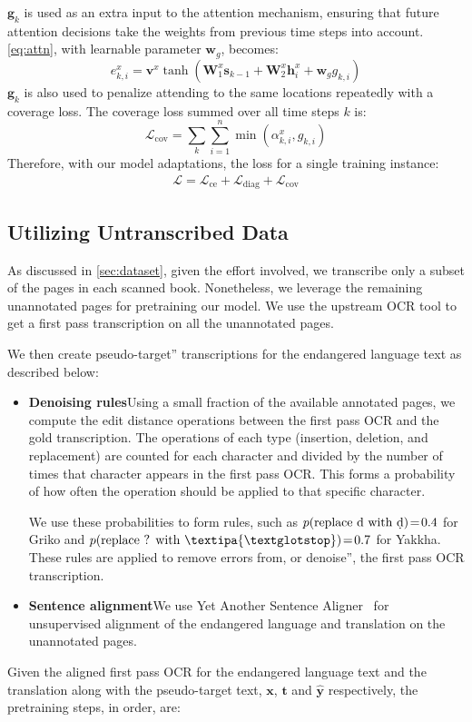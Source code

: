 $\mathbf{g}_k$ is used as an extra input to the attention mechanism, ensuring that future attention decisions take the weights from previous time steps into account. \autoref{eq:attn}, with learnable parameter $\mathbf{w}_g$, becomes:
$$e^x_{k,i}=\mathbf{v}^x \tanh\left(\mathbf{W}_1^x \mathbf{s}_{k-1} + \mathbf{W}_2^x \mathbf{h}^x_i + \mathbf{w}_g g_{k,i}\right)$$
$\mathbf{g}_k$ is also used to penalize attending to the same locations repeatedly with a coverage loss. The coverage loss summed over all time steps $k$ is:
$$\mathcal{L}_\mathrm{cov} = \sum_k \sum_{i=1}^n \min\left(\alpha_{k,i}^x, g_{k,i}\right)$$
Therefore, with our model adaptations, the loss for a single training instance:
\begin{align}
\mathcal{L} = \mathcal{L}_\mathrm{ce} + \mathcal{L}_\mathrm{diag} + \mathcal{L}_\mathrm{cov}
\label{eq:loss}
\end{align}

\subsection{Utilizing Untranscribed Data}
\label{sec:recipe2}

As discussed in \autoref{sec:dataset}, given the effort involved, we transcribe only a subset of the pages in each scanned book.
Nonetheless, we leverage the remaining unannotated pages for pretraining our model. We use the upstream OCR tool to get a first pass transcription on all the unannotated pages.

We then create \ba\ba pseudo-target'' transcriptions for the endangered language text as described below:
\begin{itemize}
    \item \textbf{Denoising rules}\quad Using a small fraction of the available annotated pages, we compute the edit distance operations between the first pass OCR and the gold transcription. The operations of each type (insertion, deletion, and replacement) are counted for each character and divided by the number of times that character appears in the first pass OCR. This forms a probability of how often the operation should be applied to that specific character.
    
    We use these probabilities to form rules, such as $p(\text{replace d with \d{d}})\!=\!0.4$ for Griko and $p(\text{replace ? with \textipa{\textglotstop}})\!=\!0.7$ for Yakkha. These rules are applied to remove errors from, or \ba\ba denoise'', the first pass OCR transcription.
    \item \textbf{Sentence alignment}\quad We use Yet Another Sentence Aligner~\cite{yasa-1336} for unsupervised alignment of the endangered language and translation on the unannotated pages. 
\end{itemize}
Given the aligned first pass OCR for the endangered language text and the translation along with the pseudo-target text, $\boldsymbol{x}$, $\boldsymbol{t}$ and $\boldsymbol{\hat{y}}$ respectively, the pretraining steps, in order, are:

